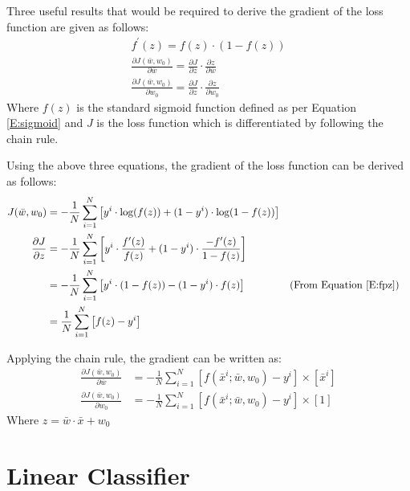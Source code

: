\documentclass[12pt, a4paper, twoside]{article}
\begin{document}
Three useful results that would be required to derive the gradient of the loss function are given as follows:
\begin{gather}
	f^{\prime}(z) = f(z) \cdot (1-f(z)) \label{E:fpz}\\
	\frac{\partial J(\bar{w}, w_0)}{\partial \bar{w}} = \frac{\partial J}{\partial z} \cdot \frac{\partial z}{\partial \bar{w}} \\
	\frac{\partial J(\bar{w}, w_0)}{\partial w_0} = \frac{\partial J}{\partial z} \cdot \frac{\partial z}{\partial w_0}
\end{gather}
Where $f(z)$ is the standard sigmoid function defined as per Equation \ref{E:sigmoid} and $J$ is the loss function which is differentiated by following the chain rule.

Using the above three equations, the gradient of the loss function can be derived as follows:
\begin{align}
	J(\bar{w}, w_0) &= - \frac{1}{N} \sum_{i=1}^{N} \left[  y^i \cdot \log(f(z)) + (1-y^i) \cdot \log(1-f(z))   \right] \\
	\frac{\partial J}{\partial z} &= - \frac{1}{N} \sum_{i=1}^{N} \left[  y^i \cdot \frac{f^{\prime}(z)}{f(z)} + (1-y^i) \cdot \frac{-f^{\prime}(z)}{1-f(z)}   \right] \\
	&= - \frac{1}{N} \sum_{i=1}^{N} \left[  y^i \cdot (1-f(z)) - (1-y^i) \cdot f(z)   \right] && \text{(From Equation \ref{E:fpz}})\\
	&= \frac{1}{N} \sum_{i=1}^{N} \left[  f(z) - y^i   \right] 
\end{align}

Applying the chain rule, the gradient \cite{ang_ml} can be written as:
\begin{align}
	\frac{\partial J(\bar{w}, w_0)}{\partial \bar{w}} &= - \frac{1}{N} \sum_{i=1}^{N} \left[  f(\bar{x}^i; \bar{w}, w_0) - y^i   \right] \times \left[ \bar{x}^i \right] \\
	\frac{\partial J(\bar{w}, w_0)}{\partial w_0} &= - \frac{1}{N} \sum_{i=1}^{N} \left[  f(\bar{x}^i; \bar{w}, w_0) - y^i   \right] \times \left[ 1 \right] 
\end{align}
Where $z = \bar{w} \cdot \bar{x} + w_0$ 
\section{Linear Classifier}\label{S:LC}
\end{document}

